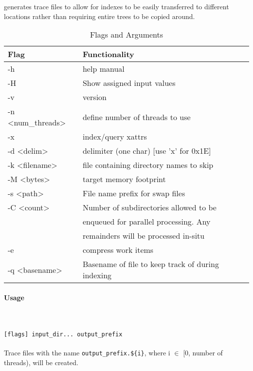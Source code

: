 \subsubsection{\gufidirtrace}
\gufidirtrace generates trace files to allow for indexes to be easily
transferred to different locations rather than requiring entire trees
to be copied around.

\begin{table} [htb]
  \centering
  \begin{tabular}{l|l}
    Flag & Functionality \\
    \hline
    -h & help manual \\
    \hline
    -H & Show assigned input values \\
    \hline
    -v & version \\
    \hline
    -n \textless num\_threads\textgreater & define number of threads to use \\
    \hline
    -x & index/query xattrs \\
    \hline
    -d \textless delim\textgreater & delimiter (one char)  [use 'x' for 0x1E] \\
    \hline
    -k \textless filename\textgreater & file containing directory names to skip \\
    \hline
    -M \textless bytes\textgreater & target memory footprint \\
    \hline
    -s \textless path\textgreater & File name prefix for swap files \\
    \hline
    -C \textless count\textgreater & Number of subdirectories allowed to be \\
                                   & enqueued for parallel processing. Any \\
                                   & remainders will be processed in-situ \\
    \hline
    -e & compress work items \\
    \hline
    -q \textless basename\textgreater & Basename of file to keep track of during indexing \\
    \hline
  \end{tabular}
  \caption{\label{fig:Flags_for_dir2trace} \gufidirtrace Flags and Arguments}
\end{table}

\paragraph{Usage} ~\\\\
\gufidirtrace \texttt{[flags] input\_dir... output\_prefix} \\\\
Trace files with the name \texttt{output\_prefix.\$\{i\}}, where i $\in$ [0, number of threads), will be created.
